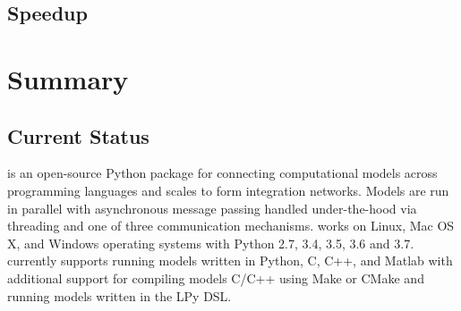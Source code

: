 \documentclass[journal]{IEEEtran}
\newcommand{\todo}[1]{{\color{red}{#1}}}
\newcommand{\pkg}{{\tt \todo{cis\_interface}}{}}
\begin{document}
\subsection{Speedup}\label{SS:speedup}
%
\todo{Write this!}

\section{Summary}\label{S:discuss}

\subsection{Current Status}\label{SS:current}
%
{\pkg} is an open-source Python package for connecting computational models across programming languages and scales to form integration networks. Models are run in parallel with asynchronous message passing handled under-the-hood via threading and one of three communication mechanisms. {\pkg} works on Linux, Mac OS X, and Windows operating systems with Python 2.7, 3.4, 3.5, 3.6 and 3.7. {\pkg} currently supports running models written in Python, C, C++, and Matlab with additional support for compiling models C/C++ using Make \citep{Stallman2004} or CMake \citep{Martin2006} and running models written in the LPy \citep{Boudon2012} DSL.

\end{document}
